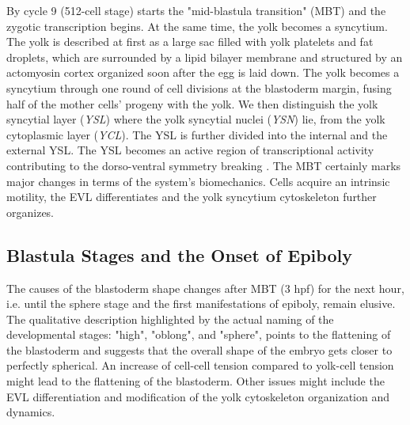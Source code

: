 By cycle 9 (512-cell stage) starts the "mid-blastula transition" (MBT) and the zygotic transcription begins. At the same time, the yolk becomes a syncytium. The yolk is described at first as a large sac filled with yolk platelets and fat droplets, which are surrounded by a lipid bilayer membrane and structured by an actomyosin cortex organized soon after the egg is laid down. The yolk becomes a syncytium through one round of cell divisions at the blastoderm margin, fusing half of the mother cells' progeny with the yolk. We then distinguish the yolk syncytial layer (\textit{YSL}) where the yolk syncytial nuclei (\textit{YSN}) lie, from the yolk cytoplasmic layer (\textit{YCL}). The YSL is further divided into the internal and the external YSL. The YSL becomes an active region of transcriptional activity contributing to the dorso-ventral symmetry breaking \cite{Hong:2010ej}. The MBT certainly marks major changes in terms of the system's biomechanics. Cells acquire an intrinsic motility, the EVL differentiates and the yolk syncytium cytoskeleton further organizes.


\subsection{Blastula Stages and the Onset of Epiboly}


The causes of the blastoderm shape changes after MBT (3 hpf) for the next hour, i.e. until the sphere stage and the first manifestations of epiboly, remain elusive. The qualitative description highlighted by the actual naming of the developmental stages: "high", "oblong", and "sphere", points to the flattening of the blastoderm and suggests that the overall shape of the embryo gets closer to perfectly spherical. An increase of cell-cell tension compared to yolk-cell tension might lead to the flattening of the blastoderm. Other issues might include the EVL differentiation and modification of the yolk cytoskeleton organization and dynamics.

